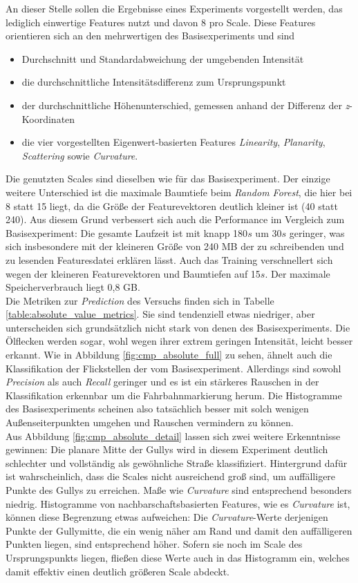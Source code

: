 An dieser Stelle sollen die Ergebnisse eines Experiments vorgestellt werden, das lediglich einwertige Features nutzt und davon 8 pro Scale. Diese Features orientieren sich an den mehrwertigen des Basisexperiments und sind 
\begin{itemize}
    \item Durchschnitt und Standardabweichung der umgebenden Intensität \citep{Li.Cheng-2018}
    \item die durchschnittliche Intensitätsdifferenz zum Ursprungspunkt
    \item der durchschnittliche Höhenunterschied, gemessen anhand der Differenz der \textit{z}-Koordinaten
    \item die vier vorgestellten Eigenwert-basierten Features \textit{Linearity}, \textit{Planarity}, \textit{Scattering} sowie \textit{Curvature}.
\end{itemize}
Die genutzten Scales sind dieselben wie für das Basisexperiment. Der einzige weitere Unterschied ist die maximale Baumtiefe beim \textit{Random Forest}, die hier bei 8 statt 15 liegt, da die Größe der Featurevektoren deutlich kleiner ist (40 statt 240). Aus diesem Grund verbessert sich auch die Performance im Vergleich zum Basisexperiment: Die gesamte Laufzeit ist mit knapp 180$s$ um 30$s$ geringer, was sich insbesondere mit der kleineren Größe von 240 MB der zu schreibenden und zu lesenden Featuresdatei erklären lässt. Auch das Training verschnellert sich wegen der kleineren Featurevektoren und Baumtiefen auf 15$s$. Der maximale Speicherverbrauch liegt 0,8 GB. \\
Die Metriken zur \textit{Prediction} des Versuchs finden sich in Tabelle \ref{table:absolute_value_metrics}. Sie sind tendenziell etwas niedriger, aber unterscheiden sich grundsätzlich nicht stark von denen des Basisexperiments. Die Ölflecken werden sogar, wohl wegen ihrer extrem geringen Intensität, leicht besser erkannt. Wie in Abbildung \ref{fig:cmp_absolute_full} zu sehen, ähnelt auch die Klassifikation der Flickstellen der vom Basisexperiment. Allerdings sind sowohl \textit{Precision} als auch \textit{Recall} geringer und es ist ein stärkeres Rauschen in der Klassifikation erkennbar um die Fahrbahnmarkierung herum. Die Histogramme des Basisexperiments scheinen also tatsächlich besser mit solch wenigen Außenseiterpunkten umgehen und Rauschen vermindern zu können. \\
Aus Abbildung \ref{fig:cmp_absolute_detail} lassen sich zwei weitere Erkenntnisse gewinnen: Die planare Mitte der Gullys wird in diesem Experiment deutlich schlechter und vollständig als gewöhnliche Straße klassifiziert. Hintergrund dafür ist wahrscheinlich, dass die Scales nicht ausreichend groß sind, um auffälligere Punkte des Gullys zu erreichen. Maße wie \textit{Curvature} sind entsprechend besonders niedrig. Histogramme von nachbarschaftsbasierten Features, wie es \textit{Curvature} ist, können diese Begrenzung etwas aufweichen: Die \textit{Curvature}-Werte derjenigen Punkte der Gullymitte, die ein wenig näher am Rand und damit den auffälligeren Punkten liegen, sind entsprechend höher. Sofern sie noch im Scale des Ursprungspunkts liegen, fließen diese Werte auch in das Histogramm ein, welches damit effektiv einen deutlich größeren Scale abdeckt. \\

